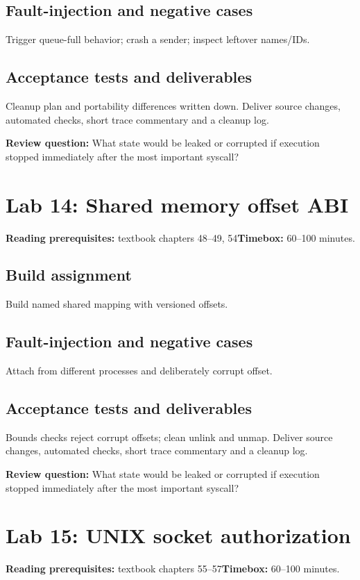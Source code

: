 \documentclass[11pt,letterpaper,oneside]{report}
\begin{document}
\subsection{Fault-injection and negative cases}
Trigger queue-full behavior; crash a sender; inspect leftover names/IDs.

\subsection{Acceptance tests and deliverables}
Cleanup plan and portability differences written down. Deliver source changes, automated checks, short trace commentary and a cleanup log.

\textbf{Review question:} What state would be leaked or corrupted if execution stopped immediately after the most important syscall?

\section{Lab 14: Shared memory offset ABI}
\textbf{Reading prerequisites:} textbook chapters 48--49, 54\quad \textbf{Timebox:} 60--100 minutes.

\subsection{Build assignment}
Build named shared mapping with versioned offsets.

\subsection{Fault-injection and negative cases}
Attach from different processes and deliberately corrupt offset.

\subsection{Acceptance tests and deliverables}
Bounds checks reject corrupt offsets; clean unlink and unmap. Deliver source changes, automated checks, short trace commentary and a cleanup log.

\textbf{Review question:} What state would be leaked or corrupted if execution stopped immediately after the most important syscall?

\section{Lab 15: UNIX socket authorization}
\textbf{Reading prerequisites:} textbook chapters 55--57\quad \textbf{Timebox:} 60--100 minutes.
\end{document}
